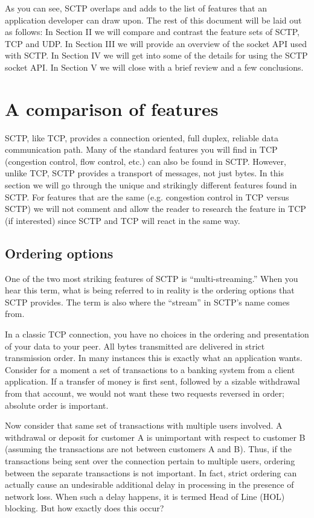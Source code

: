 \documentclass[conference]{IEEEtran}
\begin{document}
As you can see, SCTP overlaps and adds to the list
of features that an application developer can draw upon.  The rest of this document will be laid
out as follows: In Section II we will compare and contrast the feature sets of SCTP, TCP and UDP.
In Section III we will provide an overview of the socket API used with SCTP. In Section IV we will
get into some of the details for using the SCTP socket API. In Section V we will close
with a brief review and a few conclusions.

\section{A comparison of features}
SCTP, like TCP, provides a connection oriented, full duplex, reliable data communication path. 
Many of the standard features you will find in TCP (congestion control, flow control, etc.)
can also be found in SCTP. However, unlike TCP, SCTP provides a transport of messages, not just
bytes. In this section we will go through the unique and strikingly different
features found in SCTP. For features that are the same (e.g. congestion control in TCP versus
SCTP) we will not comment and allow the reader to research the feature
in TCP (if interested) since SCTP and TCP will react in the same way.

\subsection{Ordering options}
\label{hol}
One of the two most striking features of SCTP is ``multi-streaming.'' When you hear
this term, what is being referred to in reality is the ordering options that SCTP provides.
The term is also where the ``stream'' in SCTP's name comes from.

In a classic TCP connection, you have no choices in the ordering and presentation of your
data to your peer. All bytes transmitted are delivered in strict transmission order. In many
instances this is exactly what an application wants. Consider for a moment a set of
transactions to a banking system from a client application. If a transfer of
money is first sent, followed by a sizable withdrawal from that account, we would not want
these two requests reversed in order; absolute order is important. 

Now consider that same set of transactions with multiple users involved. A withdrawal or
deposit for customer A is unimportant with respect to customer B (assuming the transactions
are not between customers A and B).  Thus, if the transactions
being sent over the connection pertain to multiple users, ordering between the
separate transactions is not important. In fact, strict ordering can actually cause
an undesirable additional delay in processing in the presence of network loss.
When such a delay happens, it is termed Head of Line (HOL) blocking.
But how exactly does this occur?
\end{document}
